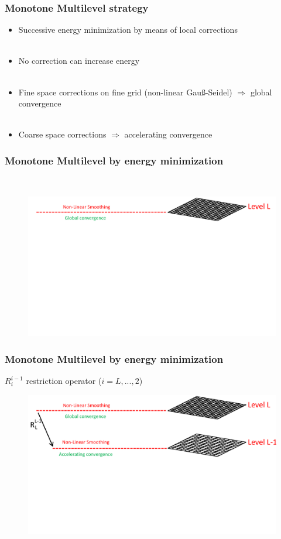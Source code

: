 \documentclass[8pt, oneside]{beamer}   	%
\newcommand{\titlecolor}[1]{\frametitle{\textcolor{dkgrey}{ \textbf{#1}}}}
\begin{document}
\begin{frame}
\titlecolor{Monotone Multilevel strategy}
\begin{itemize}
\item Successive energy minimization by means of local corrections
\\${}$\\
\item No correction can increase energy
\\${}$\\
\item Fine space corrections on fine grid (non-linear Gau{\ss}-Seidel) $\Rightarrow$ global convergence
\\${}$\\
\item Coarse space corrections $\Rightarrow$ accelerating convergence
\end{itemize}

\end{frame}




\begin{frame}
\titlecolor{Monotone Multilevel by energy minimization}
${}$
\begin{figure}[htbp!]
		\centering
	\includegraphics[width=1\textwidth]{img/multigridexplained1.pdf}
\end{figure}
\end{frame}

\begin{frame}
\titlecolor{Monotone Multilevel by energy minimization}
$R_{i}^{i-1}$ restriction operator ($ i=L,...,2 $)
\begin{figure}[htbp!]
		\centering
	\includegraphics[width=1\textwidth]{img/multigridexplained2.pdf}
\end{figure}
\end{frame}
\end{document}
